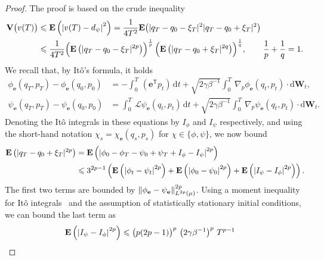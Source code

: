 \documentclass[11pt,a4paper]{article}
\newcommand{\expect}[0]{\mathbf{E}}
\newcommand{\var}[0]{\mathbf{V}}
\newcommand{\grad}{\nabla}
\newcommand{\vect}[1]{\boldsymbol{\mathbf #1}}
\renewcommand{\d}{\mathrm d}
\renewcommand{\t}{\mathsf T}
\theoremstyle{plain}
\numberwithin{equation}{section}
\renewcommand{\leq}{\leqslant}
\begin{document}
\begin{proof}
    The proof is based on the crude inequality
    \begin{align}
        \notag
        \var \bigl(v(T)\bigr)
        &\leq \expect \left( \abs{v(T) - d_{\psi}}^2 \right)
        = \frac{1}{4 T^2} \expect \big( |q_T - q_0 - \xi_T|^2 |q_T - q_0 + \xi_T|^2 \big) \\
        \label{eq:bound_variance_two_factors}
        &\leq \frac{1}{4 T^2}
        {\Bigl(\expect \left(  |q_T - q_0 - \xi_T|^{2p} \right)\Bigr)^{\frac{1}{p}}} \,
        {\Bigl(\expect \left( |q_T - q_0 + \xi_T|^{2q} \right)\Bigr)^{\frac{1}{q}}},
        \qquad \frac{1}{p} + \frac{1}{q} = 1.
    \end{align}
    We recall that, by It\^o's formula, it holds
    \begin{align*}
        \phi_{\vect e}(q_T, p_T) - \phi_{\vect e}(q_0, p_0)
        &= - \int_{0}^{T} \, (\vect e^\t p_t) \, \d t + \sqrt{2 \gamma \beta^{-1}} \int_{0}^{T} \, \grad_p \phi_{\vect e} (q_t, p_t) \cdot \d \vect W_t, \\
        \psi_{\vect e}(q_T, p_T) - \psi_{\vect e}(q_0, p_0)
        &= \int_{0}^{T} \, \mathcal L \psi_{\vect e}(q_t, p_t) \, \d t + \sqrt{2 \gamma \beta^{-1}} \int_{0}^{T} \, \grad_p \psi_{\vect e} (q_t, p_t) \cdot \d \vect W_t.
    \end{align*}
    Denoting the It\^o integrals in these equations by $I_{\phi}$ and $I_{\psi}$ respectively,
    and using the short-hand notation $\chi_{s} = \chi_{\vect e}(q_s, p_s)$ for $\chi \in \{\phi, \psi\}$,
    we now bound
    \begin{align*}
        \expect \left( |q_T - q_0 + \xi_T|^{2p} \right)
        &= \expect \left( \abs{\phi_{0} - \phi_{T} - \psi_{0} + \psi_{T}  + I_{\phi} - I_{\psi}}^{2p} \right) \\
        &\leq 3^{2p-1} \left( \expect \left( \abs{\phi_t - \psi_t}^{2p} \right) + \expect \left( \abs{\phi_0 - \psi_0}^{2p} \right) + \expect \left( \abs{I_{\psi} - I_{\phi}}^{2p} \right) \right).
    \end{align*}
    The first two terms are bounded by $\norm{\phi_{\vect e} - \psi_{\vect e}}_{L^{2p}(\mu)}^{2p}$.
    Using a moment inequality for It\^o integrals~\cite[Theorem 7.1]{MR2380366}
    and the assumption of statistically stationary initial conditions,
    we can bound the last term as
    \begin{align*}
        \expect \left( \abs{I_{\psi} - I_{\phi}}^{2p} \right)
        &\leq \bigl(p(2p - 1)\bigr)^p \, \left(2 \gamma \beta^{-1}\right)^p \,  T^{p-1} \,

\end{align*}
\end{proof}
\end{document}
